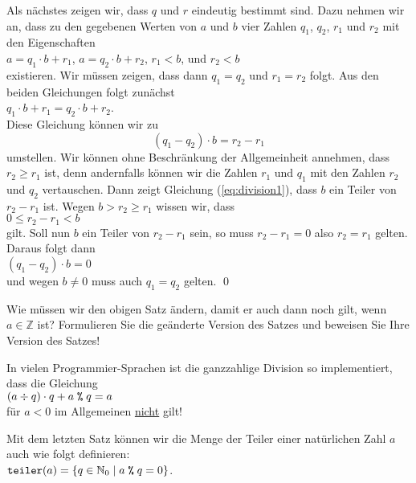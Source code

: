 Als n\"{a}chstes zeigen wir, dass $q$ und $r$ eindeutig bestimmt sind.  Dazu nehmen wir an,
dass zu den gegebenen Werten von $a$ und $b$ vier Zahlen $q_1$, $q_2$, $r_1$ und $r_2$ mit den
Eigenschaften 
\\[0.2cm]
\hspace*{1.3cm}
$a = q_1 \cdot b + r_1$, \quad
$a = q_2 \cdot b + r_2$, \quad 
$r_1 < b$, \quad und \quad $r_2 < b$
\\[0.2cm]
existieren.  Wir m\"{u}ssen zeigen, dass dann $q_1 = q_2$ und $r_1 = r_2$ folgt.  Aus den beiden
Gleichungen folgt zun\"{a}chst
\\[0.2cm]
\hspace*{1.3cm}
$q_1 \cdot b + r_1 = q_2 \cdot b + r_2$.
\\[0.2cm]
Diese Gleichung k\"{o}nnen wir zu
\begin{equation}
  \label{eq:division1}
  (q_1 - q_2) \cdot b = r_2 - r_1  
\end{equation}
umstellen.  Wir k\"{o}nnen  ohne Beschr\"{a}nkung der Allgemeinheit annehmen, dass $r_2 \geq r_1$
ist, denn andernfalls k\"{o}nnen wir die Zahlen $r_1$ und $q_1$ mit den Zahlen $r_2$ und $q_2$
vertauschen.  Dann zeigt Gleichung (\ref{eq:division1}), dass $b$ ein Teiler von $r_2 - r_1$ ist.
Wegen $b > r_2 \geq r_1$ wissen wir, dass
\\[0.2cm]
\hspace*{1.3cm}
$0 \leq r_2 - r_1 < b$
\\[0.2cm]
gilt.  Soll nun $b$ ein Teiler von $r_2 - r_1$ sein, so muss $r_2 - r_1 = 0$ also $r_2 = r_1$
gelten.  Daraus folgt dann
\\
\hspace*{1.3cm}
$(q_1 - q_2) \cdot b = 0$  
\\[0.2cm]
und wegen $b \not= 0$ muss auch $q_1 = q_2$ gelten. 
\qed

\exercise
Wie m\"{u}ssen wir den obigen Satz \"{a}ndern, damit er auch dann noch gilt, wenn  $a \in \mathbb{Z}$ ist?
Formulieren Sie die ge\"{a}nderte Version des Satzes und beweisen Sie Ihre Version des Satzes!

\remark
In vielen Programmier-Sprachen ist die ganzzahlige Division so implementiert, dass die Gleichung 
\\[0.2cm]
\hspace*{1.3cm}
$(a \div q) \cdot q + a \;\texttt{\%}\; q = a$
\\[0.2cm]
f\"{u}r $a < 0$ im Allgemeinen \underline{nicht} gilt! \eox



Mit dem letzten Satz k\"{o}nnen wir die Menge der Teiler einer nat\"{u}rlichen Zahl $a$ auch wie folgt definieren:
\\[0.2cm]
\hspace*{1.3cm}
$\texttt{teiler}(a) = \{ q \in \mathbb{N}_0 \mid a \;\texttt{\%}\; q = 0 \}$.
\vspace*{0.3cm}


